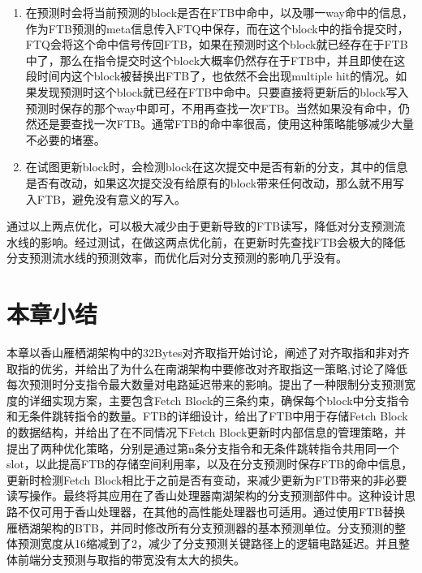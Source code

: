 \begin{enumerate}
	\item 在预测时会将当前预测的block是否在FTB中命中，以及哪一way命中的信息，作为FTB预测的meta信息传入FTQ中保存，而在这个block中的指令提交时，FTQ会将这个命中信号传回FTB，如果在预测时这个block就已经存在于FTB中了，那么在指令提交时这个block大概率仍然存在于FTB中，并且即使在这段时间内这个block被替换出FTB了，也依然不会出现multiple hit的情况。如果发现预测时这个block就已经在FTB中命中。只要直接将更新后的block写入预测时保存的那个way中即可，不用再查找一次FTB。当然如果没有命中，仍然还是要查找一次FTB。通常FTB的命中率很高，使用这种策略能够减少大量不必要的堵塞。
	\item 在试图更新block时，会检测block在这次提交中是否有新的分支，其中的信息是否有改动，如果这次提交没有给原有的block带来任何改动，那么就不用写入FTB，避免没有意义的写入。
\end{enumerate}

通过以上两点优化，可以极大减少由于更新导致的FTB读写，降低对分支预测流水线的影响。经过测试，在做这两点优化前，在更新时先查找FTB会极大的降低分支预测流水线的预测效率，而优化后对分支预测的影响几乎没有。


\section{本章小结}

本章以香山雁栖湖架构中的32Bytes对齐取指开始讨论，阐述了对齐取指和非对齐取指的优劣，并给出了为什么在南湖架构中要修改对齐取指这一策略,讨论了降低每次预测时分支指令最大数量对电路延迟带来的影响。提出了一种限制分支预测宽度的详细实现方案，主要包含Fetch Block的三条约束，确保每个block中分支指令和无条件跳转指令的数量。FTB的详细设计，给出了FTB中用于存储Fetch Block的数据结构，并给出了在不同情况下Fetch Block更新时内部信息的管理策略，并提出了两种优化策略，分别是通过第n条分支指令和无条件跳转指令共用同一个slot，以此提高FTB的存储空间利用率，以及在分支预测时保存FTB的命中信息，更新时检测Fetch Block相比于之前是否有变动，来减少更新为FTB带来的非必要读写操作。最终将其应用在了香山处理器南湖架构的分支预测部件中。这种设计思路不仅可用于香山处理器，在其他的高性能处理器也可适用。通过使用FTB替换雁栖湖架构的BTB，并同时修改所有分支预测器的基本预测单位。分支预测的整体预测宽度从16缩减到了2，减少了分支预测关键路径上的逻辑电路延迟。并且整体前端分支预测与取指的带宽没有太大的损失。
